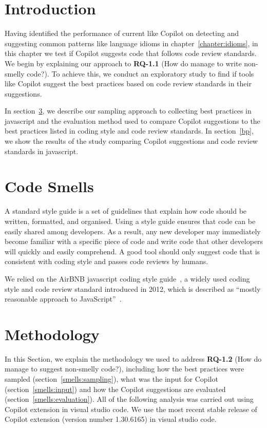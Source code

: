 \label{chapter:smells}

\section{Introduction}
Having identified the performance of current \cct{} like Copilot on detecting and suggesting common patterns like language idioms in chapter~\ref{chapter:idioms}, in this chapter we test if Copilot suggests code that follows code review standards.
We begin by explaining our approach to \textbf{RQ-1.1} (How do \cct{} manage to write non-smelly code?). To achieve this, we conduct an exploratory study to find if \cct{} tools like Copilot suggest the best practices based on code review standards in their suggestions. 

In section~\ref{smells:methodology}, we describe our sampling approach to collecting best practices in javascript and the evaluation method used to compare Copilot suggestions to the best practices listed in coding style and code review standards. 
In section~\ref{bp}, we show the results of the study comparing Copilot suggestions and code review standards in javascript.

\section{Code Smells}
\label{smells}
A standard style guide is a set of guidelines that explain how code should be written, formatted, and organised. 
Using a style guide ensures that code can be easily shared among developers. As a result, any new developer may immediately become familiar with a specific piece of code and write code that other developers will quickly and easily comprehend.
A good \cct{} tool should only suggest code that is consistent with coding style and passes code reviews by humans. 

We relied on the AirBNB javascript coding style guide~\cite{airbnb_code}, a widely used coding style and code review standard introduced in 2012, which is described as ``mostly reasonable approach to JavaScript''~\cite{airbnb_code}.

\section{Methodology}
\label{smells:methodology}
In this Section, we explain the methodology we used to address \textbf{RQ-1.2} (How do \cct{} manage to suggest non-smelly code?), including how the best practices were sampled (section~\ref{smells:sampling}), what was the input for Copilot (section~\ref{smells:input}) and how the Copilot suggestions are evaluated (section~\ref{smells:evaluation}). All of the following analysis was carried out using Copilot extension in visual studio code. We use the most recent stable release of Copilot extension (version number 1.30.6165) in visual studio code.

